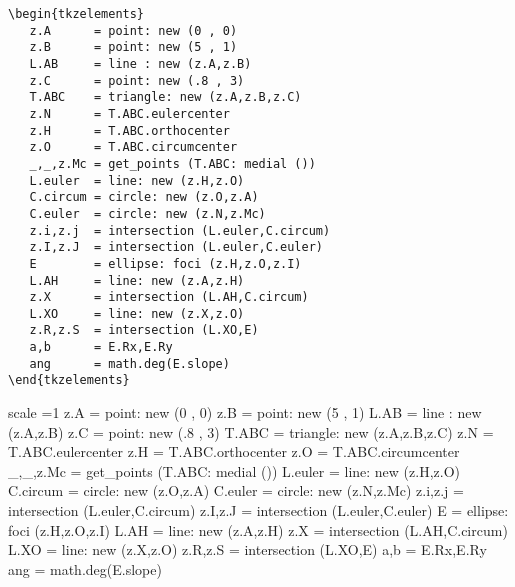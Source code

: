 \begin{minipage}{.5\textwidth}
\begin{Verbatim}
\begin{tkzelements}
   z.A      = point: new (0 , 0)
   z.B      = point: new (5 , 1)
   L.AB     = line : new (z.A,z.B)
   z.C      = point: new (.8 , 3)
   T.ABC    = triangle: new (z.A,z.B,z.C)
   z.N      = T.ABC.eulercenter
   z.H      = T.ABC.orthocenter
   z.O      = T.ABC.circumcenter
   _,_,z.Mc = get_points (T.ABC: medial ())
   L.euler  = line: new (z.H,z.O)
   C.circum = circle: new (z.O,z.A)
   C.euler  = circle: new (z.N,z.Mc)
   z.i,z.j  = intersection (L.euler,C.circum)
   z.I,z.J  = intersection (L.euler,C.euler)
   E        = ellipse: foci (z.H,z.O,z.I)
   L.AH     = line: new (z.A,z.H)
   z.X      = intersection (L.AH,C.circum)
   L.XO     = line: new (z.X,z.O)
   z.R,z.S  = intersection (L.XO,E)
   a,b      = E.Rx,E.Ry
   ang      = math.deg(E.slope)
\end{tkzelements}
\end{Verbatim}
\end{minipage}
\begin{minipage}{.5\textwidth}
  \begin{tkzelements}
     scale =1
     z.A   = point: new (0 , 0)
     z.B   = point: new (5 , 1)
     L.AB  = line : new (z.A,z.B)
     z.C   = point: new (.8 , 3)
     T.ABC     = triangle: new (z.A,z.B,z.C)
     z.N = T.ABC.eulercenter
     z.H = T.ABC.orthocenter
     z.O = T.ABC.circumcenter
     _,_,z.Mc  = get_points (T.ABC: medial ())
     L.euler   = line: new (z.H,z.O)
     C.circum  = circle: new (z.O,z.A)
     C.euler   = circle: new (z.N,z.Mc)
     z.i,z.j   = intersection (L.euler,C.circum)
     z.I,z.J   = intersection (L.euler,C.euler)
     E     = ellipse: foci (z.H,z.O,z.I)
     L.AH  = line: new (z.A,z.H)
     z.X   = intersection (L.AH,C.circum)
     L.XO  = line: new (z.X,z.O)
     z.R,z.S   = intersection (L.XO,E)
     a,b   = E.Rx,E.Ry
     ang   = math.deg(E.slope)
  \end{tkzelements}
  
  \begin{center}
  \end{center}


\end{minipage}

